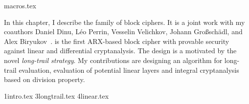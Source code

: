\myminitoc

{macros.tex}

In this chapter, I describe the \sparx{} family of block ciphers. It is a joint work with my coauthors Daniel Dinu, Léo Perrin, Vesselin Velichkov, Johann Gro{\ss}sch\"{a}dl, and Alex Biryukov~\cite{OurSPARX}. \sparx{} is the first ARX-based block cipher with provable security against linear and differential cryptanalysis. The design is a motivated by the novel \emph{long-trail strategy}. My contributions are designing an algorithm for long-trail evaluation, evaluation of potential linear layers and integral cryptanalysis based on division property.

{1intro.tex}
{3longtrail.tex}
{4linear.tex}


